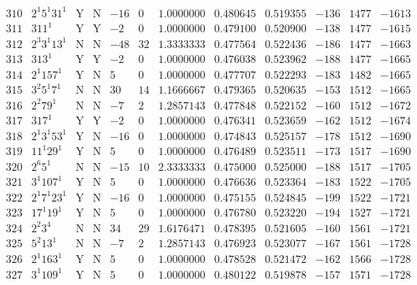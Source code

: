 \documentclass[11pt,reqno,a4letter]{article}
\numberwithin{figure}{section}
\numberwithin{table}{section}
\theoremstyle{plain}
\numberwithin{theorem}{section}
\theoremstyle{definition}
\begin{document}
\begin{table}[h!]
\begin{equation*}
{\begin{array}{cc|cc|ccc|cc|ccc}
 310 & 2^1 5^1 31^1 & \text{Y} & \text{N} & -16 & 0 & 1.0000000 & 0.480645 & 0.519355 & -136 & 1477 & -1613 \\
 311 & 311^1 & \text{Y} & \text{Y} & -2 & 0 & 1.0000000 & 0.479100 & 0.520900 & -138 & 1477 & -1615 \\
 312 & 2^3 3^1 13^1 & \text{N} & \text{N} & -48 & 32 & 1.3333333 & 0.477564 & 0.522436 & -186 & 1477 & -1663 \\
 313 & 313^1 & \text{Y} & \text{Y} & -2 & 0 & 1.0000000 & 0.476038 & 0.523962 & -188 & 1477 & -1665 \\
 314 & 2^1 157^1 & \text{Y} & \text{N} & 5 & 0 & 1.0000000 & 0.477707 & 0.522293 & -183 & 1482 & -1665 \\
 315 & 3^2 5^1 7^1 & \text{N} & \text{N} & 30 & 14 & 1.1666667 & 0.479365 & 0.520635 & -153 & 1512 & -1665 \\
 316 & 2^2 79^1 & \text{N} & \text{N} & -7 & 2 & 1.2857143 & 0.477848 & 0.522152 & -160 & 1512 & -1672 \\
 317 & 317^1 & \text{Y} & \text{Y} & -2 & 0 & 1.0000000 & 0.476341 & 0.523659 & -162 & 1512 & -1674 \\
 318 & 2^1 3^1 53^1 & \text{Y} & \text{N} & -16 & 0 & 1.0000000 & 0.474843 & 0.525157 & -178 & 1512 & -1690 \\
 319 & 11^1 29^1 & \text{Y} & \text{N} & 5 & 0 & 1.0000000 & 0.476489 & 0.523511 & -173 & 1517 & -1690 \\
 320 & 2^6 5^1 & \text{N} & \text{N} & -15 & 10 & 2.3333333 & 0.475000 & 0.525000 & -188 & 1517 & -1705 \\
 321 & 3^1 107^1 & \text{Y} & \text{N} & 5 & 0 & 1.0000000 & 0.476636 & 0.523364 & -183 & 1522 & -1705 \\
 322 & 2^1 7^1 23^1 & \text{Y} & \text{N} & -16 & 0 & 1.0000000 & 0.475155 & 0.524845 & -199 & 1522 & -1721 \\
 323 & 17^1 19^1 & \text{Y} & \text{N} & 5 & 0 & 1.0000000 & 0.476780 & 0.523220 & -194 & 1527 & -1721 \\
 324 & 2^2 3^4 & \text{N} & \text{N} & 34 & 29 & 1.6176471 & 0.478395 & 0.521605 & -160 & 1561 & -1721 \\
 325 & 5^2 13^1 & \text{N} & \text{N} & -7 & 2 & 1.2857143 & 0.476923 & 0.523077 & -167 & 1561 & -1728 \\
 326 & 2^1 163^1 & \text{Y} & \text{N} & 5 & 0 & 1.0000000 & 0.478528 & 0.521472 & -162 & 1566 & -1728 \\
 327 & 3^1 109^1 & \text{Y} & \text{N} & 5 & 0 & 1.0000000 & 0.480122 & 0.519878 & -157 & 1571 & -1728 \\

\end{array}}
\end{equation*}
\end{table}
\end{document}
